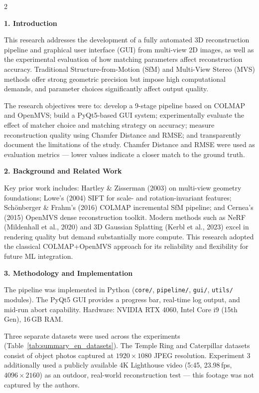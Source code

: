\begin{multicols}{2}
\setlength{\parskip}{5pt}
\sloppy

\noindent\textbf{1. Introduction}

This research addresses the development of a fully automated 3D reconstruction pipeline and graphical user interface (GUI) from multi-view 2D images, as well as the experimental evaluation of how matching parameters affect reconstruction accuracy. Traditional Structure-from-Motion (SfM) and Multi-View Stereo (MVS) methods offer strong geometric precision but impose high computational demands, and parameter choices significantly affect output quality.

The research objectives were to: develop a 9-stage pipeline based on COLMAP and OpenMVS; build a PyQt5-based GUI system; experimentally evaluate the effect of matcher choice and matching strategy on accuracy; measure reconstruction quality using Chamfer Distance and RMSE; and transparently document the limitations of the study. Chamfer Distance and RMSE were used as evaluation metrics --- lower values indicate a closer match to the ground truth.

\noindent\textbf{2. Background and Related Work}

Key prior work includes: Hartley \& Zisserman (2003) on multi-view geometry foundations; Lowe's (2004) SIFT for scale- and rotation-invariant features; Sch{\"o}nberger \& Frahm's (2016) COLMAP incremental SfM pipeline; and Cernea's (2015) OpenMVS dense reconstruction toolkit. Modern methods such as NeRF (Mildenhall et al., 2020) and 3D Gaussian Splatting (Kerbl et al., 2023) excel in rendering quality but demand substantially more compute. This research adopted the classical COLMAP+OpenMVS approach for its reliability and flexibility for future ML integration.

\noindent\textbf{3. Methodology and Implementation}

The pipeline was implemented in Python (\texttt{core/}, \texttt{pipeline/}, \texttt{gui/}, \texttt{utils/} modules). The PyQt5 GUI provides a progress bar, real-time log output, and mid-run abort capability. Hardware: NVIDIA RTX 4060, Intel Core i9 (15th Gen), 16\,GB RAM.

Three separate datasets were used across the experiments (Table~\ref{tab:summary_en_datasets}). The Temple Ring and Caterpillar datasets consist of object photos captured at $1920\times1080$ JPEG resolution. Experiment 3 additionally used a publicly available 4K Lighthouse video (5:45, 23.98\,fps, $4096\times2160$) as an outdoor, real-world reconstruction test --- this footage was not captured by the authors.


\end{multicols}
